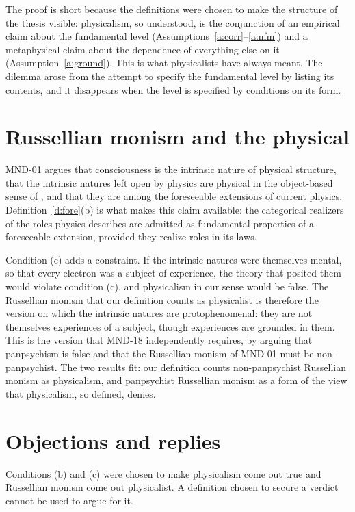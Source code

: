 \documentclass{situationist-preprint}
\begin{document}
The proof is short because the definitions were chosen to make the structure of the thesis visible: physicalism, so understood, is the conjunction of an empirical claim about the fundamental level (Assumptions~\ref{a:corr}--\ref{a:nfm}) and a metaphysical claim about the dependence of everything else on it (Assumption~\ref{a:ground}). This is what physicalists have always meant. The dilemma arose from the attempt to specify the fundamental level by listing its contents, and it disappears when the level is specified by conditions on its form.

\section{Russellian monism and the physical}\label{s:russell}

MND-01 argues that consciousness is the intrinsic nature of physical structure, that the intrinsic natures left open by physics are physical in the object-based sense of \citet{Stoljar2001}, and that they are among the foreseeable extensions of current physics. Definition~\ref{d:fore}(b) is what makes this claim available: the categorical realizers of the roles physics describes are admitted as fundamental properties of a foreseeable extension, provided they realize roles in its laws.

Condition (c) adds a constraint. If the intrinsic natures were themselves mental, so that every electron was a subject of experience, the theory that posited them would violate condition (c), and physicalism in our sense would be false. The Russellian monism that our definition counts as physicalist is therefore the version on which the intrinsic natures are protophenomenal: they are not themselves experiences of a subject, though experiences are grounded in them. This is the version that MND-18 independently requires, by arguing that panpsychism is false and that the Russellian monism of MND-01 must be non-panpsychist. The two results fit: our definition counts non-panpsychist Russellian monism as physicalism, and panpsychist Russellian monism as a form of the view that physicalism, so defined, denies.

\section{Objections and replies}

\begin{objection}
Conditions (b) and (c) were chosen to make physicalism come out true and Russellian monism come out physicalist. A definition chosen to secure a verdict cannot be used to argue for it.
\end{objection}
\end{document}

